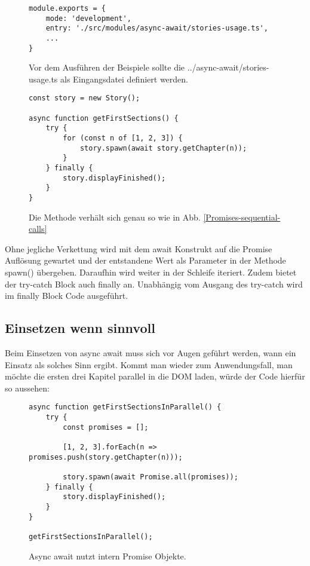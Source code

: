 \begin{figure}[H]
\begin{lstlisting}[basicstyle=\small]
module.exports = {
    mode: 'development',
    entry: './src/modules/async-await/stories-usage.ts',
    ...
}
\end{lstlisting}
\caption{Vor dem Ausführen der Beispiele sollte die ../async-await/stories-usage.ts als Eingangsdatei definiert werden.}
\end{figure}

\begin{figure}[H]
\begin{lstlisting}[basicstyle=\small]
const story = new Story();

async function getFirstSections() {
    try {
        for (const n of [1, 2, 3]) {
            story.spawn(await story.getChapter(n));
        }
    } finally {
        story.displayFinished();
    }
}
\end{lstlisting}
\caption{Die Methode verhält sich genau so wie in Abb. \ref{Promises-sequential-calls}}
\end{figure}

\noindent
Ohne jegliche Verkettung wird mit dem await Konstrukt auf die Promise Auflösung gewartet und der entstandene Wert als Parameter in der Methode spawn() übergeben. Daraufhin wird weiter in der Schleife iteriert. Zudem bietet der try-catch Block auch finally an. Unabhängig vom Ausgang des try-catch wird im finally Block Code ausgeführt.

\subsection{Einsetzen wenn sinnvoll}

Beim Einsetzen von async await muss sich vor Augen geführt werden, wann ein Einsatz als solches Sinn ergibt. Kommt man wieder zum Anwendungsfall, man möchte die ersten drei Kapitel parallel in die DOM laden, würde der Code hierfür so aussehen:

\begin{figure}[H]
\begin{lstlisting}[basicstyle=\small]
async function getFirstSectionsInParallel() {
    try {
        const promises = [];

        [1, 2, 3].forEach(n => promises.push(story.getChapter(n)));

        story.spawn(await Promise.all(promises));
    } finally {
        story.displayFinished();
    }
}

getFirstSectionsInParallel();
\end{lstlisting}
\caption{Async await nutzt intern Promise Objekte.}
\end{figure}

